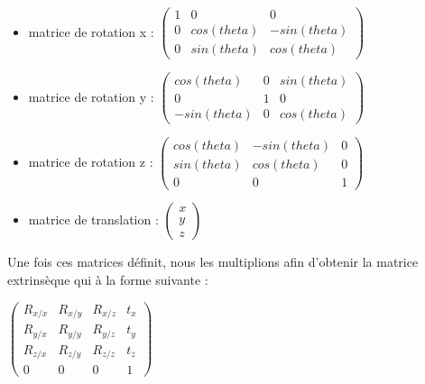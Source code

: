 \documentclass[a4paper,11pt]{article}
\begin{document}
  \begin{itemize}
   \item matrice de rotation x : 
   $\begin{pmatrix}
     1 & 0 & 0\\
     0 & cos(theta) & -sin(theta)\\
     0 & sin(theta) & cos(theta)
    \end{pmatrix}$
    
   \item matrice de rotation y : 
   $\begin{pmatrix}
     cos(theta) & 0 & sin(theta)\\
     0 & 1 & 0\\
     -sin(theta) & 0 & cos(theta)
    \end{pmatrix}$
    
   \item matrice de rotation z : 
   $\begin{pmatrix}
     cos(theta) & -sin(theta) & 0\\
     sin(theta) & cos(theta) & 0\\
     0 & 0 & 1
    \end{pmatrix}$
    
   \item matrice de translation : 
   $\begin{pmatrix}
     x\\
     y\\
     z
    \end{pmatrix}$

  \end{itemize}
  
  Une fois ces matrices définit, nous les multiplions afin d'obtenir la matrice
  extrinsèque qui à la forme suivante :\\
  \begin{center}
    $\begin{pmatrix}
      R_{x/x} & R_{x/y} & R_{x/z} & t_{x}\\
      R_{y/x} & R_{y/y} & R_{y/z} & t_{y}\\
      R_{z/x} & R_{z/y} & R_{z/z} & t_{z}\\
      0 & 0 & 0 & 1
      \end{pmatrix}$
  \end{center}
\end{document}
